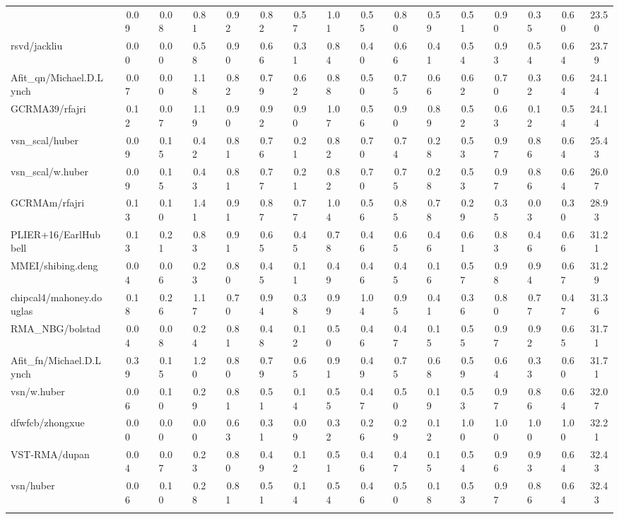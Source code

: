 \begin{table}[hptb]
\begin{center}
\begin{tabular}{|l||c|c|c|c|c|c|c|c|c|c|c|c|c|c|c|}
{g14Mb/rfajri&~~0.09&~~0.08&~~0.81&~~0.92&~~0.82&~~0.57&~~1.01&~~0.55&~~0.80&~~0.59&~~0.51&~~0.90&~~0.35&~~0.60&~23.50\\ 
rsvd/jackliu&~~0.00&~~0.00&~~0.58&~~0.90&~~0.66&~~0.31&~~0.84&~~0.40&~~0.66&~~0.41&~~0.54&~~0.93&~~0.54&~~0.64&~23.79\\ 
Afit_qn/Michael.D.Lynch&~~0.07&~~0.00&~~1.18&~~0.82&~~0.79&~~0.62&~~0.88&~~0.50&~~0.75&~~0.66&~~0.62&~~0.70&~~0.32&~~0.64&~24.14\\ 
GCRMA39/rfajri&~~0.12&~~0.07&~~1.19&~~0.90&~~0.92&~~0.90&~~1.07&~~0.56&~~0.90&~~0.89&~~0.52&~~0.63&~~0.12&~~0.54&~24.14\\ 
vsn_scal/huber&~~0.09&~~0.15&~~0.42&~~0.81&~~0.76&~~0.21&~~0.82&~~0.70&~~0.74&~~0.28&~~0.53&~~0.97&~~0.86&~~0.64&~25.43\\ 
vsn_scal/w.huber&~~0.09&~~0.15&~~0.43&~~0.81&~~0.77&~~0.21&~~0.82&~~0.70&~~0.75&~~0.28&~~0.53&~~0.97&~~0.86&~~0.64&~26.07\\ 
GCRMAm/rfajri&~~0.13&~~0.10&~~1.41&~~0.91&~~0.87&~~0.77&~~1.04&~~0.56&~~0.85&~~0.78&~~0.29&~~0.35&~~0.03&~~0.30&~28.93\\ 
PLIER+16/EarlHubbell&~~0.13&~~0.21&~~0.83&~~0.91&~~0.65&~~0.45&~~0.78&~~0.46&~~0.65&~~0.46&~~0.61&~~0.83&~~0.46&~~0.66&~31.21\\ 
MMEI/shibing.deng&~~0.04&~~0.06&~~0.23&~~0.80&~~0.45&~~0.11&~~0.49&~~0.46&~~0.45&~~0.16&~~0.57&~~0.98&~~0.94&~~0.67&~31.29\\ 
chipcal4/mahoney.douglas&~~0.18&~~0.26&~~1.17&~~0.70&~~0.94&~~0.38&~~0.99&~~1.04&~~0.95&~~0.41&~~0.36&~~0.80&~~0.77&~~0.47&~31.36\\ 
RMA_NBG/bolstad&~~0.04&~~0.08&~~0.24&~~0.81&~~0.48&~~0.12&~~0.50&~~0.46&~~0.47&~~0.15&~~0.55&~~0.97&~~0.92&~~0.65&~31.71\\ 
Afit_fn/Michael.D.Lynch&~~0.39&~~0.15&~~1.20&~~0.80&~~0.79&~~0.65&~~0.91&~~0.49&~~0.75&~~0.68&~~0.59&~~0.64&~~0.33&~~0.60&~31.71\\ 
vsn/w.huber&~~0.06&~~0.10&~~0.29&~~0.81&~~0.51&~~0.14&~~0.55&~~0.47&~~0.50&~~0.19&~~0.53&~~0.97&~~0.86&~~0.64&~32.07\\ 
dfwfcb/zhongxue&~~0.00&~~0.00&~~0.00&~~0.63&~~0.31&~~0.09&~~0.32&~~0.26&~~0.29&~~0.12&~~1.00&~~1.00&~~1.00&~~1.00&~32.21\\ 
VST-RMA/dupan&~~0.04&~~0.07&~~0.23&~~0.80&~~0.49&~~0.12&~~0.51&~~0.46&~~0.47&~~0.15&~~0.54&~~0.96&~~0.93&~~0.64&~32.43\\ 
vsn/huber&~~0.06&~~0.10&~~0.28&~~0.81&~~0.51&~~0.14&~~0.54&~~0.46&~~0.50&~~0.18&~~0.53&~~0.97&~~0.86&~~0.64&~32.43\\ 
}
\end{tabular}
\end{center}
\end{table}
